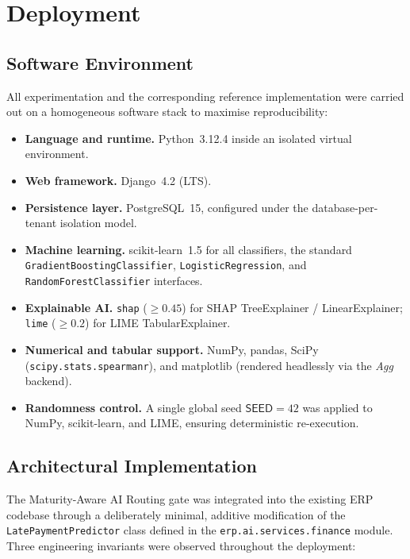 \section{Deployment}
\label{sec:deployment}

\subsection{Software Environment}
\label{subsec:software-env}

All experimentation and the corresponding reference implementation were
carried out on a homogeneous software stack to maximise reproducibility:

\begin{itemize}
    \item \textbf{Language and runtime.} Python~3.12.4 inside an isolated
    virtual environment.
    \item \textbf{Web framework.} Django~4.2 (LTS).
    \item \textbf{Persistence layer.} PostgreSQL~15, configured under the
    database-per-tenant isolation model.
    \item \textbf{Machine learning.} scikit-learn~1.5 for all classifiers,
    the standard \texttt{GradientBoostingClassifier},
    \texttt{LogisticRegression}, and \texttt{RandomForestClassifier}
    interfaces.
    \item \textbf{Explainable AI.} \texttt{shap} ($\ge 0.45$) for SHAP
    TreeExplainer / LinearExplainer; \texttt{lime} ($\ge 0.2$) for LIME
    TabularExplainer.
    \item \textbf{Numerical and tabular support.} NumPy, pandas, SciPy
    (\texttt{scipy.stats.spearmanr}), and matplotlib (rendered headlessly
    via the \emph{Agg} backend).
    \item \textbf{Randomness control.} A single global seed
    $\textsf{SEED} = 42$ was applied to NumPy, scikit-learn, and LIME,
    ensuring deterministic re-execution.
\end{itemize}

\subsection{Architectural Implementation}
\label{subsec:arch-impl}

The Maturity-Aware AI Routing gate was integrated into the existing ERP
codebase through a deliberately minimal, additive modification of the
\texttt{LatePaymentPredictor} class defined in the
\texttt{erp.ai.services.finance} module. Three engineering invariants were
observed throughout the deployment:


